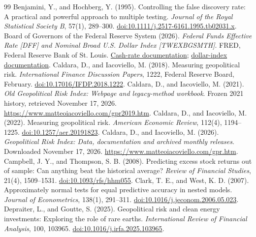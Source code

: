 \begin{thebibliography}{99}
\small
{} Benjamini, Y., and Hochberg, Y. (1995). Controlling the false discovery rate: A practical and powerful approach to multiple testing. \textit{Journal of the Royal Statistical Society B}, 57(1), 289–300. \href{https://doi.org/10.1111/j.2517-6161.1995.tb02031.x}{doi:10.1111/j.2517-6161.1995.tb02031.x}.
 Board of Governors of the Federal Reserve System (2026). \textit{Federal Funds Effective Rate [DFF] and Nominal Broad U.S. Dollar Index [TWEXBGSMTH]}. FRED, Federal Reserve Bank of St. Louis. \href{https://fred.stlouisfed.org/series/DFF}{Cash-rate documentation}; \href{https://fred.stlouisfed.org/series/TWEXBGSMTH}{dollar-index documentation}.
 Caldara, D., and Iacoviello, M. (2018). Measuring geopolitical risk. \textit{International Finance Discussion Papers}, 1222, Federal Reserve Board, February. \href{https://doi.org/10.17016/IFDP.2018.1222}{doi:10.17016/IFDP.2018.1222}.
 Caldara, D., and Iacoviello, M. (2021). \textit{Old Geopolitical Risk Index: Webpage and legacy-method workbook}. Frozen 2021 history, retrieved November 17, 2026. \url{https://www.matteoiacoviello.com/gpr2019.htm}.
 Caldara, D., and Iacoviello, M. (2022). Measuring geopolitical risk. \textit{American Economic Review}, 112(4), 1194–1225. \href{https://doi.org/10.1257/aer.20191823}{doi:10.1257/aer.20191823}.
 Caldara, D., and Iacoviello, M. (2026). \textit{Geopolitical Risk Index: Data, documentation and archived monthly releases}. Downloaded November 17, 2026. \url{https://www.matteoiacoviello.com/gpr.htm}.
 Campbell, J. Y., and Thompson, S. B. (2008). Predicting excess stock returns out of sample: Can anything beat the historical average? \textit{Review of Financial Studies}, 21(4), 1509–1531. \href{https://doi.org/10.1093/rfs/hhm055}{doi:10.1093/rfs/hhm055}.
 Clark, T. E., and West, K. D. (2007). Approximately normal tests for equal predictive accuracy in nested models. \textit{Journal of Econometrics}, 138(1), 291–311. \href{https://doi.org/10.1016/j.jeconom.2006.05.023}{doi:10.1016/j.jeconom.2006.05.023}.
 Depraiter, L., and Goutte, S. (2025). Geopolitical risk and clean energy investments: Exploring the role of rare earths. \textit{International Review of Financial Analysis}, 100, 103965. \href{https://doi.org/10.1016/j.irfa.2025.103965}{doi:10.1016/j.irfa.2025.103965}.

\end{thebibliography}
